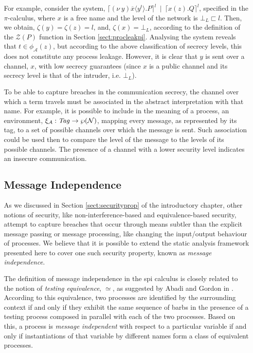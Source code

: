 \documentclass[10pt,a4paper,final,oneside,fleqn]{book}
\begin{document}
For example, consider the system, $\lceil(\nu~\!y)\overline{x}\langle y^t\rangle.P\rceil^l~\mid~\lceil x(z).Q\rceil^l$, specified in the $\pi$-calculus, where $x$ is a free name and the level of the network is $\bot_L\sqsubset l$.  Then, we obtain, $\zeta(y)=\zeta(z)=l$, and, $\zeta(x)=\bot_L$, according to the definition of the $\mathcal{Z}(P)$ function in Section \ref{sect:procleakpi}.  Analysing the system reveals that $t\in\phi_\mathcal{A}(z)$, but according to the above classification of secrecy levels, this does not constitute any process leakage.  However, it is clear that $y$ is sent over a channel, $x$, with low secrecy guarantees (since $x$ is a public channel and its secrecy level is that of the intruder, i.e. $\bot_L$).

To be able to capture breaches in the communication secrecy, the channel over which a term travels must be associated in the abstract interpretation with that name.  For example, it is possible to include in the meaning of a process, an environment, $\xi_\mathcal{A}:\mbox{{\itshape Tag\/}}\to\wp(\mathcal{N})$, mapping every message, as represented by its tag, to a set of possible channels over which the message is sent.  Such association could be used then to compare the level of the message to the levels of its possible channels. The presence of a channel with a lower security level indicates an insecure communication.
\subsection{Message Independence}
As we discussed in Section \ref{sect:securityprop} of the introductory chapter, other notions of security, like non-interference-based and equivalence-based security, attempt to capture breaches that occur through means subtler than the explicit message passing or message processing, like changing the input/output behaviour of processes. We believe that it is possible to extend the static analysis framework presented here to cover one such security property, known as {\itshape message independence\/}.

The definition of message independence in the spi calculus is closely related to the notion of {\itshape testing equivalence\/}, $\simeq$, as suggested by Abadi and Gordon in \cite{abadi1}.  According to this equivalence, two processes are identified by the surrounding context if and only if they exhibit the same sequence of barbs in the presence of a testing process composed in parallel with each of the two processes.  Based on this, a process is {\itshape message independent\/} with respect to a particular variable if and only if instantiations of that variable by different names form a class of equivalent processes.
\end{document}
